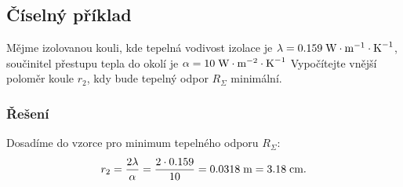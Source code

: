 \documentclass{article}
\begin{document}
\subsection{Číselný příklad}
Mějme izolovanou kouli, kde tepelná vodivost izolace je $\lambda = 0.159 \; \textrm{W} \cdot \textrm{m}^{-1} \cdot \textrm{K}^{-1}$, součinitel přestupu tepla do okolí je $\alpha = 10 \; \textrm{W} \cdot \textrm{m}^{-2} \cdot \textrm{K}^{-1}$ Vypočítejte vnější poloměr koule $r_2$, kdy bude tepelný odpor $R_\Sigma$ minimální.


\subsubsection{Řešení}
Dosadíme do vzorce pro minimum tepelného odporu $R_\Sigma$:
$$
    r_2 = \frac{2 \lambda}{\alpha} = \frac{2 \cdot 0.159}{10} = 0.0318 \; \textrm{m} = 3.18 \; \textrm{cm}.
$$
\end{document}
